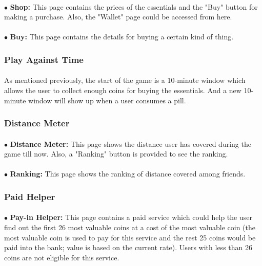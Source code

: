 \documentclass[paper=a4, fontsize=11pt]{scrartcl} %
\begin{document}
\paragraph{}$\bullet$ \textbf{Shop: } This page contains the prices of the essentials and the "Buy" button for making a purchase. Also, the "Wallet" page could be accessed from here.
\paragraph{}$\bullet$ \textbf{Buy: } This page contains the details for buying a certain kind of thing.

\subsubsection{Play Against Time}
\paragraph{} As mentioned previously, the start of the game is a 10-minute window which allows the user to collect enough coins for buying the essentials. And a new 10-minute window will show up when a user consumes a pill.

\subsubsection{Distance Meter}
\paragraph{}$\bullet$ \textbf{Distance Meter: } This page shows the distance user has covered during the game till now. Also, a "Ranking" button is provided to see the ranking.
\paragraph{}$\bullet$ \textbf{Ranking: } This page shows the ranking of distance covered among friends.

\subsubsection{Paid Helper}
\paragraph{}$\bullet$ \textbf{Pay-in Helper: } This page contains a paid service which could help the user find out the first 26 most valuable coins at a cost of the most valuable coin (the most valuable coin is used to pay for this service and the rest 25 coins would be paid into the bank; value is based on the current rate). Users with less than 26 coins are not eligible for this service.
\end{document}
